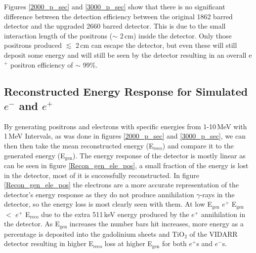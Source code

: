 \documentclass[12pt,a4paper]{article}
\begin{document}
Figures \ref{2000_p_sec} and \ref{3000_p_sec} show that there is no significant difference between the detection efficiency between the original 1862 barred detector and the upgraded 2660 barred detector. This is due to the small interaction length of the positrons ($\sim$ 2\,cm) inside the detector. Only those positrons produced $\lesssim$ 2\,cm can escape the detector, but even these will still deposit some energy and will still be seen by the detector resulting in an overall e$^+$ positron efficiency of $\sim$ 99\%. 

\subsection{Reconstructed Energy Response for Simulated $e^-$ and $e^+$}
By generating positrons and electrons with specific energies from 1-10\,MeV with 1\,MeV Intervals, as was done in figures \ref{2000_p_sec} and \ref{3000_p_sec}, we can then then take the mean reconstructed energy (E$_\textrm{{reco}}$) and compare it to the generated energy (E$_\textrm{{gen}}$). The energy response of the detector is mostly linear as can be seen in figure \ref{Recon_gen_ele_pos}, a small fraction of the energy is lost in the detector, most of it is successfully reconstructed. In figure \ref{Recon_gen_ele_pos} the electrons are a more accurate representation of the detector's energy response as they do not produce annihilation $\gamma$-rays in the detector, so the energy loss is most clearly seen with them. At low E$_\textrm{{gen}}$ $e^+$ E$_\textrm{{gen}}$ $<$ $e^+$ E$_\textrm{{reco}}$ due to the extra 511\,keV energy produced by the $e^+$ annihilation in the detector. As E$_\textrm{{gen}}$ increases the number bars hit increases, more energy as a percentage is deposited into the gadolinium sheets and TiO$_2$ of the VIDARR detector resulting in higher E$_\textrm{{reco}}$ loss at higher E$_\textrm{{gen}}$ for both $e^+$s and $e^-$s.  
\end{document}

